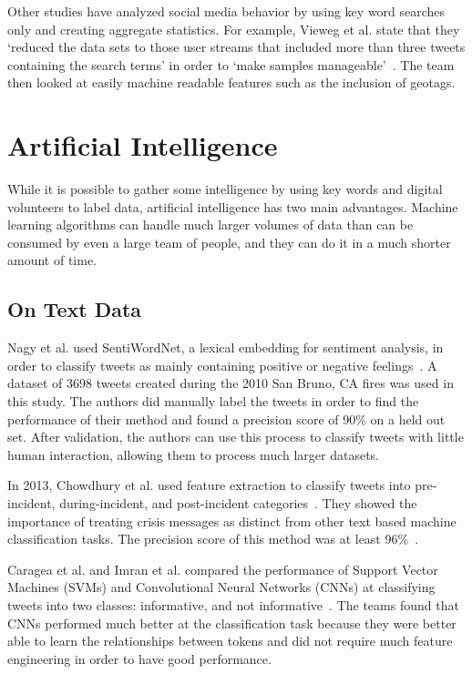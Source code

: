 Other studies have analyzed social media behavior by using key word searches only and
creating aggregate statistics. For example, Vieweg et al. state that they `reduced
the data sets to those user streams that included more than three tweets
containing the search terms' in order to 
`make samples manageable'~\cite{viewegMicrobloggingTwoNatural2010}. The team then looked
at easily machine readable features such as the inclusion of geotags.

\section{Artificial Intelligence}
While it is possible to gather some intelligence by using key words and
digital volunteers to label data, artificial intelligence has two main advantages. 
Machine learning algorithms can handle much larger volumes of data than can be 
consumed by even a large team of people, and they can do it in a much 
shorter amount of time.

\subsection{On Text Data}\label{chap3:text}
Nagy et al. used SentiWordNet, a lexical embedding for sentiment analysis, in order 
to classify tweets as mainly containing positive or negative feelings~\cite{nagyCrowdSentimentDetection2012}.
A dataset of 3698 tweets created during the 2010 San Bruno, CA fires was used in this study. 
The authors did manually label the tweets in order to find the performance of their
method and found a precision score of 90\% on a held out set. After validation,
the authors can use this process to classify tweets with little human interaction,
allowing them to process much larger datasets.

In 2013, Chowdhury et al. used feature extraction to classify tweets into
pre-incident, during-incident, and post-incident categories~\cite{chowdhuryTweet4actUsingIncidentspecific2013}.
They showed the importance of treating crisis messages as distinct from other
text based machine classification tasks. The precision score of this method 
was at least 96\%~\cite{chowdhuryTweet4actUsingIncidentspecific2013}.

Caragea et al. and Imran et al. compared the performance of Support Vector Machines (SVMs) and Convolutional 
Neural Networks (CNNs) at classifying tweets into two classes: informative, and not
informative~\cite{carageaIdentifyingInformativeMessages2016,imranPracticalExtractionDisasterrelevant2013}. The
teams found that CNNs performed much better at the classification task because they were better 
able to learn the relationships between tokens and did not require much feature engineering in order 
to have good performance.

